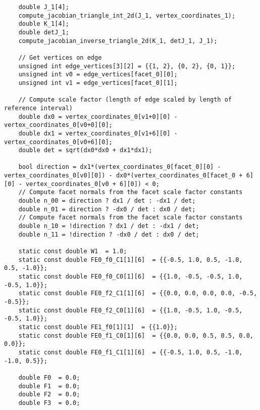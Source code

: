 \documentclass[a4paper]{article}
\begin{document}
\begin{appendices}
\begin{lstlisting}
    double J_1[4];
    compute_jacobian_triangle_int_2d(J_1, vertex_coordinates_1);
    double K_1[4];
    double detJ_1;
    compute_jacobian_inverse_triangle_2d(K_1, detJ_1, J_1);

    // Get vertices on edge
    unsigned int edge_vertices[3][2] = {{1, 2}, {0, 2}, {0, 1}};
    unsigned int v0 = edge_vertices[facet_0][0];
    unsigned int v1 = edge_vertices[facet_0][1];

    // Compute scale factor (length of edge scaled by length of reference interval)
    double dx0 = vertex_coordinates_0[v1+0][0] - vertex_coordinates_0[v0+0][0];
    double dx1 = vertex_coordinates_0[v1+6][0] - vertex_coordinates_0[v0+6][0];
    double det = sqrt(dx0*dx0 + dx1*dx1);

    bool direction = dx1*(vertex_coordinates_0[facet_0][0] - vertex_coordinates_0[v0][0]) - dx0*(vertex_coordinates_0[facet_0 + 6][0] - vertex_coordinates_0[v0 + 6][0]) < 0;
    // Compute facet normals from the facet scale factor constants
    double n_00 = direction ? dx1 / det : -dx1 / det;
    double n_01 = direction ? -dx0 / det : dx0 / det;
    // Compute facet normals from the facet scale factor constants
    double n_10 = !direction ? dx1 / det : -dx1 / det;
    double n_11 = !direction ? -dx0 / det : dx0 / det;
 
    static const double W1  = 1.0;  
    static const double FE0_f0_C1[1][6]  = {{-0.5, 1.0, 0.5, -1.0, 0.5, -1.0}};  
    static const double FE0_f0_C0[1][6]  = {{1.0, -0.5, -0.5, 1.0, -0.5, 1.0}};  
    static const double FE0_f2_C1[1][6]  = {{0.0, 0.0, 0.0, 0.0, -0.5, -0.5}};  
    static const double FE0_f2_C0[1][6]  = {{1.0, -0.5, 1.0, -0.5, -0.5, 1.0}};  
    static const double FE1_f0[1][1]  = {{1.0}};  
    static const double FE0_f1_C0[1][6]  = {{0.0, 0.0, 0.5, 0.5, 0.0, 0.0}};  
    static const double FE0_f1_C1[1][6]  = {{-0.5, 1.0, 0.5, -1.0, -1.0, 0.5}};

    double F0  = 0.0;
    double F1  = 0.0;
    double F2  = 0.0;
    double F3  = 0.0;


\end{lstlisting}
\end{appendices}
\end{document}
